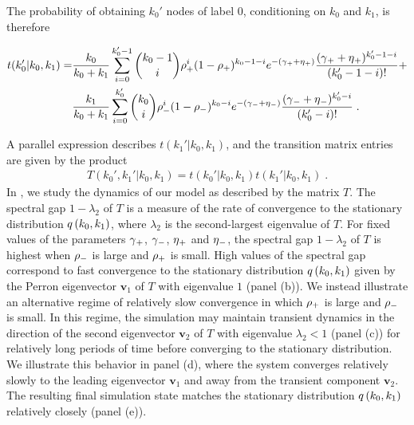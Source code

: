\documentclass[aps,pre,reprint,superscriptaddress,nofootinbib]{revtex4-2}
\begin{document}
    The probability of obtaining $k_0'$ nodes of label 0, conditioning on $k_0$ and $k_1$, is therefore 
    \begin{widetext}
        \begin{align*}
            t(k_0' | k_0, k_1) =& \frac{k_0}{k_0 + k_1} \sum_{i=0}^{k_0' - 1} \binom{k_0 - 1}{i} \rho{}_+^i (1 - \rho{}_+)^{k_0 - 1 - i} 
            e^{-(\gamma{}_+ + \eta{}_+)} \frac{(\gamma{}_+ + \eta{}_+)^{k_0' - 1 - i}}{(k_0' - 1 - i)!}  + \\ 
            & \frac{k_1}{k_0 + k_1} \sum_{i=0}^{k_0'} \binom{k_0}{i} \rho{}_-^i (1 - \rho{}_-)^{k_0 - i} 
            e^{-(\gamma{}_- + \eta{}_-)} \frac{(\gamma{}_- + \eta{}_-)^{k_0' - i}}{(k_0' - i)!}\;.
        \end{align*}
    \end{widetext}
    A parallel expression describes $t(k_1' | k_0, k_1)$, and the transition matrix entries are given by the product 
    \begin{align*}
        T(k_0', k_1' | k_0, k_1) = t(k_0' | k_0, k_1) t(k_1' | k_0, k_1) \;.
    \end{align*}
    In , we study the dynamics of our \model{} model as described by the matrix $T$. 
    The spectral gap $1 - \lambda_2$ of $T$ is a measure of the rate of convergence to the stationary distribution $q \left( k_0, k_1 \right)$, where $\lambda_2$ is the second-largest eigenvalue of $T$.
    For fixed values of the parameters $\gamma{}_+$, $\gamma{}_-$, $\eta{}_+$ and $\eta{}_-$, the spectral gap $1 - \lambda_2$ of $T$ is highest when $\rho_-$ is large and $\rho_+$ is small. 
    High values of the spectral gap correspond to fast convergence to the stationary distribution $q \left( k_0, k_1 \right)$ given by the Perron eigenvector $\mathbf{v}_1$ of $T$ with eigenvalue $1$ (panel (b)). 
    We instead illustrate an alternative regime of relatively slow convergence in which $\rho_+$ is large and $\rho_-$ is small.
    In this regime, the simulation may maintain transient dynamics in the direction of the second eigenvector $\mathbf{v}_2$ of $T$ with eigenvalue $\lambda_2 < 1$ (panel (c)) for relatively long periods of time before converging to the stationary distribution. 
    We illustrate this behavior in panel (d), where the system converges relatively slowly to the leading eigenvector $\mathbf{v}_1$ and away from the transient component $\mathbf{v}_2$. 
    The resulting final simulation state matches the stationary distribution $q \left( k_0, k_1 \right)$ relatively closely (panel (e)).
\end{document}
